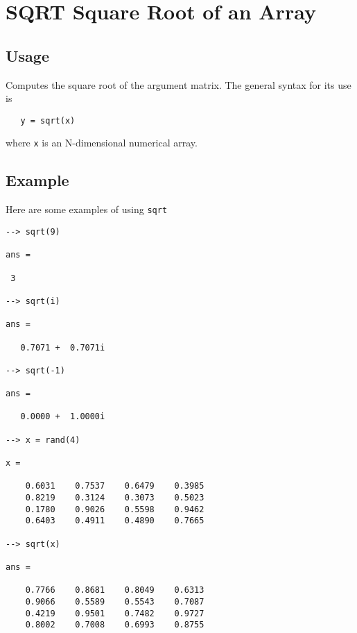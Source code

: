 \section{SQRT Square Root of an Array}

\subsection{Usage}

Computes the square root of the argument matrix.  The general
syntax for its use is
\begin{verbatim}
   y = sqrt(x)
\end{verbatim}
where \verb|x| is an N-dimensional numerical array.
\subsection{Example}

Here are some examples of using \verb|sqrt|
\begin{verbatim}
--> sqrt(9)

ans = 

 3 

--> sqrt(i)

ans = 

   0.7071 +  0.7071i 

--> sqrt(-1)

ans = 

   0.0000 +  1.0000i 

--> x = rand(4)

x = 

    0.6031    0.7537    0.6479    0.3985 
    0.8219    0.3124    0.3073    0.5023 
    0.1780    0.9026    0.5598    0.9462 
    0.6403    0.4911    0.4890    0.7665 

--> sqrt(x)

ans = 

    0.7766    0.8681    0.8049    0.6313 
    0.9066    0.5589    0.5543    0.7087 
    0.4219    0.9501    0.7482    0.9727 
    0.8002    0.7008    0.6993    0.8755 
\end{verbatim}
